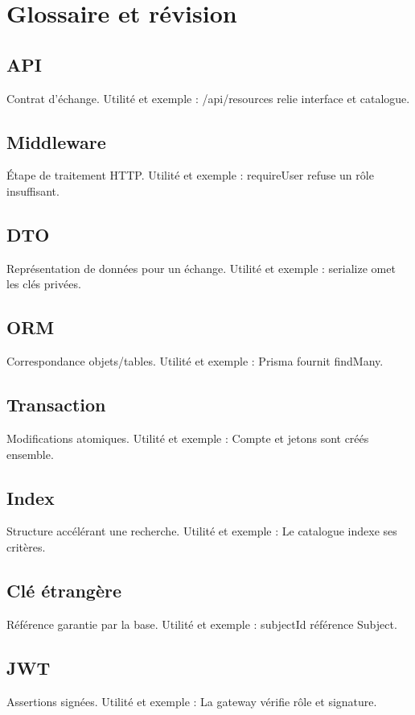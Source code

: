 \chapter{Glossaire et révision}
\section*{API}
Contrat d’échange. Utilité et exemple : /api/resources relie interface et catalogue.

\section*{Middleware}
Étape de traitement HTTP. Utilité et exemple : requireUser refuse un rôle insuffisant.

\section*{DTO}
Représentation de données pour un échange. Utilité et exemple : serialize omet les clés privées.

\section*{ORM}
Correspondance objets/tables. Utilité et exemple : Prisma fournit findMany.

\section*{Transaction}
Modifications atomiques. Utilité et exemple : Compte et jetons sont créés ensemble.

\section*{Index}
Structure accélérant une recherche. Utilité et exemple : Le catalogue indexe ses critères.

\section*{Clé étrangère}
Référence garantie par la base. Utilité et exemple : subjectId référence Subject.

\section*{JWT}
Assertions signées. Utilité et exemple : La gateway vérifie rôle et signature.

